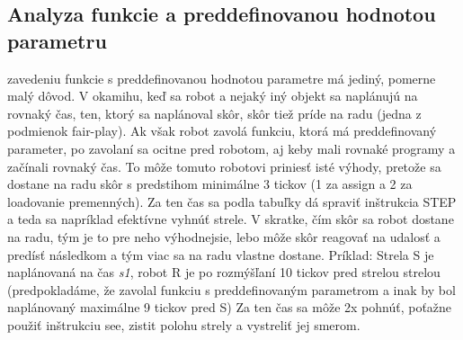 \subsection{Analyza funkcie a preddefinovanou hodnotou parametru}
zavedeniu funkcie s preddefinovanou hodnotou parametre má jediný, pomerne malý dôvod. V okamihu, keď sa robot a nejaký iný objekt sa naplánujú na rovnaký čas, ten, ktorý sa naplánoval skôr, skôr tiež príde na radu (jedna z podmienok fair-play). Ak však robot zavolá funkciu, ktorá má preddefinovaný parameter, po zavolaní sa ocitne pred robotom, aj keby mali rovnaké programy a začínali rovnaký čas. To môže tomuto robotovi priniesť isté výhody, pretože sa dostane na radu skôr s predstihom minimálne 3 tickov (1 za assign a 2 za loadovanie premenných). Za ten čas sa podla tabuľky dá spraviť inštrukcia STEP a teda sa napríklad efektívne vyhnúť strele. V skratke, čím skôr sa robot dostane na radu, tým je to pre neho výhodnejsie, lebo môže skôr reagovať na udalosť a predísť následkom a tým viac sa na radu vlastne dostane. Príklad: Strela S je naplánovaná na čas {\it s1}, robot R je po rozmýšľaní 10 tickov pred strelou strelou (predpokladáme, že zavolal funkciu s preddefinovaným parametrom a inak by bol naplánovaný maximálne 9 tickov pred S) Za ten čas sa môže 2x pohnúť, poťažne použiť inštrukciu see, zistit polohu strely a vystreliť jej smerom.
